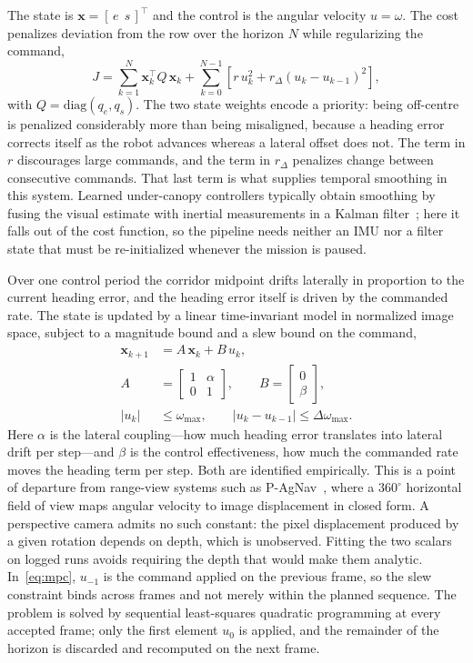 \documentclass[conference]{IEEEtran}
\begin{document}
The state is $\mathbf{x} = [\,e\;\,s\,]^{\!\top}$ and the control is the angular
velocity $u=\omega$. The cost penalizes deviation from the row over the horizon
$N$ while regularizing the command,
\begin{equation}
J = \sum_{k=1}^{N} \mathbf{x}_k^{\!\top} Q\, \mathbf{x}_k
  + \sum_{k=0}^{N-1} \left[ r\,u_k^2
  + r_\Delta \left(u_k-u_{k-1}\right)^2 \right],
\label{eq:cost}
\end{equation}
with $Q=\mathrm{diag}(q_e,q_s)$. The two state weights encode a priority: being
off-centre is penalized considerably more than being misaligned, because a
heading error corrects itself as the robot advances whereas a lateral offset
does not. The term in $r$ discourages large commands, and the term in $r_\Delta$
penalizes change between consecutive commands. That last term is what supplies
temporal smoothing in this system. Learned under-canopy controllers typically
obtain smoothing by fusing the visual estimate with inertial measurements in a
Kalman filter~\cite{sivakumar2021cropfollow}; here it falls out of the cost
function, so the pipeline needs neither an IMU nor a filter state that must be
re-initialized whenever the mission is paused.

Over one control period the corridor midpoint drifts laterally in proportion to
the current heading error, and the heading error itself is driven by the
commanded rate. The state is updated by a linear time-invariant model in
normalized image space, subject to a magnitude bound and a slew bound on the
command,
\begin{align}
\mathbf{x}_{k+1} &= A\,\mathbf{x}_k + B\,u_k, \nonumber\\
A &= \begin{bmatrix} 1 & \alpha \\ 0 & 1 \end{bmatrix},
\qquad
B = \begin{bmatrix} 0 \\ \beta \end{bmatrix}, \nonumber\\
\left|u_k\right| &\le \omega_{\max},
\qquad
\left|u_k-u_{k-1}\right| \le \Delta\omega_{\max}.
\label{eq:mpc}
\end{align}
Here $\alpha$ is the lateral coupling---how much heading error translates into
lateral drift per step---and $\beta$ is the control effectiveness, how much the
commanded rate moves the heading term per step. Both are identified empirically.
This is a point of departure from range-view systems such as
P-AgNav~\cite{kim2025pagnav}, where a $360^{\circ}$ horizontal field of view
maps angular velocity to image displacement in closed form. A perspective camera
admits no such constant: the pixel displacement produced by a given rotation
depends on depth, which is unobserved. Fitting the two scalars on logged runs
avoids requiring the depth that would make them analytic. In~\eqref{eq:mpc},
$u_{-1}$ is the command applied on the previous frame, so the slew constraint
binds across frames and not merely within the planned sequence. The problem is
solved by sequential least-squares quadratic programming at every accepted
frame; only the first element $u_0$ is applied, and the remainder of the horizon
is discarded and recomputed on the next frame.
\end{document}
